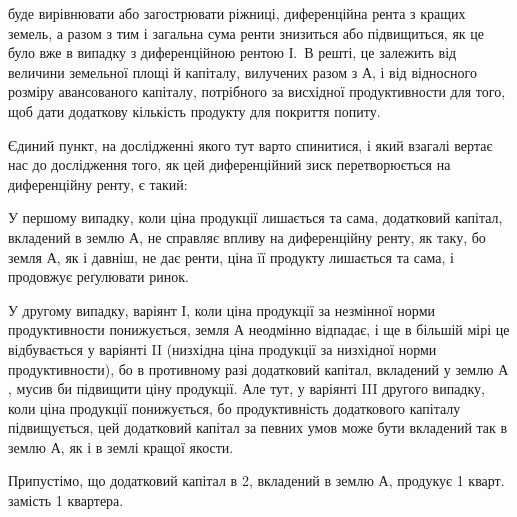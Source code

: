 \parcont{}  %
буде вирівнювати або загострювати ріжниці, диференційна рента з кращих земель,
а разом з тим і загальна сума ренти знизиться або підвищиться, як це було
вже в випадку з диференційною рентою І.~В решті, це залежить від величини земельної
площі й капіталу, вилучених разом з $А$, і від відносного розміру авансованого
капіталу, потрібного за висхідної продуктивности для того, щоб дати
додаткову кількість продукту для покриття попиту.

Єдиний пункт, на дослідженні якого тут варто спинитися, і який взагалі
вертає нас до дослідження того, як цей диференційний зиск перетворюється
на диференційну ренту, є такий:

У першому випадку, коли ціна продукції лишається та сама, додатковий
капітал, вкладений в землю $А$, не справляє впливу на диференційну ренту, як
таку, бо земля $А$, як і давніш, не дає ренти, ціна її продукту лишається та
сама, і продовжує реґулювати ринок.

У другому випадку, варіянт І, коли ціна продукції за незмінної норми продуктивности
понижується, земля $А$ неодмінно відпадає, і ще в більшій мірі це
відбувається у варіянті II (низхідна ціна продукції за низхідної норми продуктивности),
бо в противному разі додатковий капітал, вкладений у землю $А$,
мусив би підвищити ціну продукції. Але тут, у варіянті III другого випадку,
коли ціна продукції понижується, бо продуктивність додаткового капіталу підвищується,
цей додатковий капітал за певних умов може бути вкладений так
в землю $А$, як і в землі кращої якости.

Припустімо, що додатковий капітал в 2, вкладений в землю
$А$, продукує 1 кварт. замість 1 квартера.

